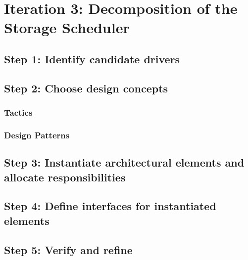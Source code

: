 \section{Iteration 3: Decomposition of the Storage Scheduler}
\label{add:it3}

\subsection{Step 1: Identify candidate drivers}
\label{add:it3/drivers}

\subsection{Step 2: Choose design concepts}
\label{add:it3/concepts}

\subsubsection{Tactics}
\label{add:it3/tactics}

\subsubsection{Design Patterns}
\label{add:it3/patterns}

\subsection{Step 3: Instantiate architectural elements and allocate responsibilities}
\label{add:it3/elements}

\subsection{Step 4: Define interfaces for instantiated elements}
\label{add:it3/interfaces}

\subsection{Step 5: Verify and refine}
\label{add:it3/verification}